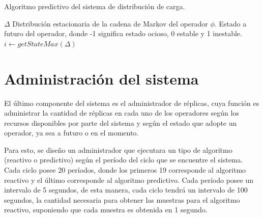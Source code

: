 \begin{algorithm}[!ht]
	\caption{Algoritmo predictivo del sistema de distribución de carga.}
	\label{alg:predictive}
	\begin{algorithmic}[1]
	\REQUIRE$\Delta$ Distribución estacionaria de la cadena de Markov del operador $\phi$.
	\ENSURE Estado a futuro del operador, donde -1 significa estado ocioso, 0 estable y 1 inestable.
		\STATE $i \leftarrow getStateMax(\Delta)$ 
		\ELSE
		\ENDIF
	\ENDIF
	
	
	\end{algorithmic}
\end{algorithm}

\section{Administración del sistema}

El último componente del sistema es el administrador de réplicas, cuya función es administrar la cantidad de réplicas en cada uno de los operadores según los recursos disponibles por parte del sistema y según el estado que adopte un operador, ya sea a futuro o en el momento.

Para esto, se diseño un administrador que ejecutara un tipo de algoritmo (reactivo o predictivo) según el período del ciclo que se encuentre el sistema. Cada ciclo posee 20 períodos, donde los primeros 19 corresponde al algoritmo reactivo y el último corresponde al algoritmo predictivo. Cada período posee un intervalo de 5 segundos, de esta manera, cada ciclo tendrá un intervalo de 100 segundos, la cantidad necesaria para obtener las muestras para el algoritmo reactivo, suponiendo que cada muestra es obtenida en 1 segundo.

